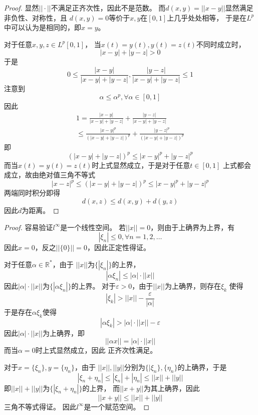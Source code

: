 \documentclass[cn]{homework}
\begin{document}
    \problem
    \begin{proof}
        显然$||\cdot||$不满足正齐次性，因此不是范数。
        而$d(x,y)=||x-y||$显然满足非负性、对称性，且
        $d(x,y)=0$等价于$x,y$在$[0,1]$上几乎处处相等，
        于是在$L^p$中可以认为是相同的，即$x=y$。

        对于任意$x,y,z\in L^p[0,1]$，
        当$x(t)=y(t),y(t)=z(t)$不同时成立时，
        \[|x-y|+|y-z|>0\]
        于是
        \[0\leq\frac{|x-y|}{|x-y|+|y-z|},\frac{|y-z|}{|x-y|+|y-z|}\leq 1\]
        注意到
        \[\alpha\leq\alpha^p,\forall\alpha\in[0,1]\]
        因此
        \begin{multline*}
            1=
            \frac{|x-y|}{|x-y|+|y-z|}+\frac{|y-z|}{|x-y|+|y-z|}\\
            \leq
            \frac{|x-y|^p}{(|x-y|+|y-z|)^p}+\frac{|y-z|^p}{(|x-y|+|y-z|)^p}
        \end{multline*}
        即
        \[(|x-y|+|y-z|)^p\leq |x-y|^p+|y-z|^p\]
        而当$x(t)=y(t)=z(t)$时上式显然成立，于是对于任意$t\in[0,1]$
        上式都会成立，故由绝对值三角不等式
        \[|x-z|^p\leq(|x-y|+|y-z|)^p\leq|x-y|^p+|y-z|^p\]
        两端同时积分即得
        \[d(x,z)\leq d(x,y)+d(y,z)\]
        因此$d$为距离。
    \end{proof}

    \problem
    \begin{proof}
        容易验证$l^\infty$是一个线性空间。
        若$||x||=0$，则由于上确界为上界，有
        \[|\xi_n|\leq 0,\forall n=1,2,\ldots\]
        因此$x=0$，反之$||\{0\}||=0$，因此正定性得证。

        对于任意$\alpha\in\mathbb R^*$，由于
        $||x||$为$\{|\xi_n|\}$的上界，
        \[|\alpha\xi_n|\leq|\alpha|\cdot||x||\]
        因此$|\alpha|\cdot||x||$为$\{|\alpha\xi_n|\}$的上界。
        对于$\varepsilon>0$，由于$||x||$为上确界，则存在$\xi_k$
        使得
        \[|\xi_k|>||x||-\frac\varepsilon{|\alpha|}\]
        于是存在$\alpha\xi_k$使得
        \[|\alpha\xi_k|>|\alpha|\cdot||x||-\varepsilon\]
        因此$|\alpha|\cdot||x||$为上确界，即
        \[||\alpha x||=|\alpha|\cdot||x||\]
        而当$\alpha=0$时上式显然成立，因此
        正齐次性满足。
        
        对于$x=\{\xi_n\},y=\{\eta_n\}$，由于
        $||x||,||y||$分别为$\{|\xi_n\},\{\eta_n\}$的上确界，于是
        \[|\xi_n+\eta_n|\leq|\xi_n|+|\eta_n|\leq||x||+||y||\]
        即$||x||+||y||$为$\{|\xi_n+\eta_n|\}$的上界，
        而$||x+y||$为其上确界，因此
        \[||x+y||\leq||x||+||y||\]
        三角不等式得证。
        因此$l^\infty$是一个赋范空间。
    \end{proof}
\end{document}
